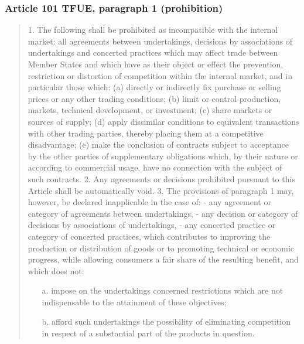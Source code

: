 \newpage
        \subsubsection{Article 101 TFUE, paragraph 1 (prohibition)}

            \begin{quote}
                1. The following shall be prohibited as incompatible with the internal market: all agreements between undertakings, decisions by associations of undertakings and concerted practices which may affect trade between Member States and which have as their object or effect the prevention, restriction or distortion of competition within the internal market, and in particular those which:
                    (a) directly or indirectly fix purchase or selling prices or any other trading conditions; (b) limit or control production, markets, technical development, or investment; (c) share markets or sources of supply; (d) apply dissimilar conditions to equivalent transactions with other trading parties, thereby placing them at a competitive disadvantage; (e) make the conclusion of contracts subject to acceptance by the other parties of supplementary obligations which, by their nature or according to commercial usage, have no connection with the subject of such contracts.
                2. Any agreements or decisions prohibited pursuant to this Article shall be automatically void.
                3. The provisions of paragraph 1 may, however, be declared inapplicable in the case of: - any agreement or category of agreements between undertakings, - any decision or category of decisions by associations of undertakings, - any concerted practice or category of concerted practices, which contributes to improving the production or distribution of goods or to promoting technical or economic progress, while allowing consumers a fair share of the resulting benefit, and which does not:
                    \begin{itemize}
                        \item[a.] impose on the undertakings concerned restrictions which are not indispensable to the attainment of these objectives;
                        \item[b.] afford such undertakings the possibility of eliminating competition in respect of a substantial part of the products in question.
                    \end{itemize}

            \end{quote}     

